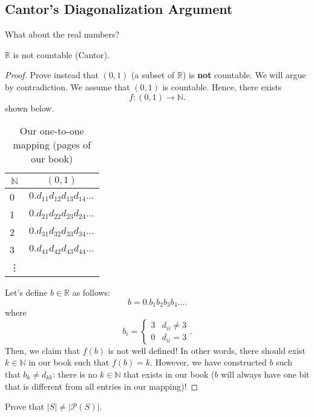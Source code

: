 \documentclass[a4paper]{article}
\begin{document}
\subsection{Cantor's Diagonalization Argument}
What about the real numbers?
\begin{theorem}
	\( \mathbb{R} \) is not countable (Cantor).
\end{theorem}
\begin{proof}
	Prove instead that \( (0,1) \) (a subset of \( \mathbb{R} \)) is \textbf{not} countable. We will argue by contradiction. We assume that \( (0,1) \) is countable. Hence, there exists \[
		f \colon (0,1) \to \mathbb{N} 
	.\] shown below.

	\begin{table}[H]
		\caption{Our one-to-one mapping (pages of our book)}\label{tab:}
		\begin{center}
			\begin{tabular}[c]{|l|l|}
				\hline
				\multicolumn{1}{|c|}{\textbf{\( \mathbb{N} \)}} & 
				\multicolumn{1}{c|}{\textbf{\( (0,1) \)}} \\
				\hline
				0 & \( 0.d_{11} d_{12} d_{13} d_{14} \ldots  \) \\
				1 & \( 0.d_{21} d_{22} d_{23} d_{24} \ldots  \) \\
				2 & \( 0.d_{31} d_{32} d_{33} d_{34} \ldots  \) \\
				3 & \( 0.d_{41} d_{42} d_{43} d_{44} \ldots  \) \\
				\vdots & \\
				\hline
			\end{tabular}
		\end{center}
	\end{table}

	Let's define \( b \in \mathbb{R} \) as follows: \[
		b = 0.b_1b_2b_3b_4 \ldots
	.\] where \[
		b_i = \begin{cases}
			3 & d_{ii} \neq 3 \\
			0 & d_{ii} = 3
		\end{cases}
	.\] Then, we claim that \( f(b) \) is not well defined! In other words, there should exist \( k \in \mathbb{N}\) in our book such that \( f(b) = k \). However, we have constructed \( b \) such that \( b_k \neq d_{kk} \): there is no \( k \in \mathbb{N} \) that exists in our book \contra (\( b \) will always have one bit that is different from all entries in our mapping)!
\end{proof}

Prove that \( |S| \neq |\mathcal{P}(S)| \).
\end{document}
